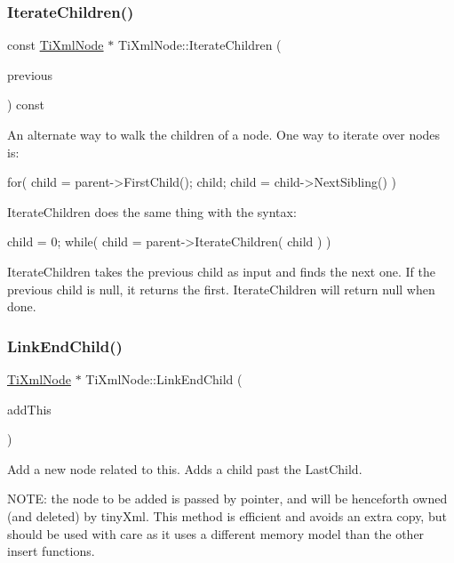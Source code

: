 \subsubsection{\texorpdfstring{Iterate\+Children()}{IterateChildren()}}
{\footnotesize\ttfamily const \hyperlink{class_ti_xml_node}{Ti\+Xml\+Node} $\ast$ Ti\+Xml\+Node\+::\+Iterate\+Children (\begin{DoxyParamCaption}\item[{const \hyperlink{class_ti_xml_node}{Ti\+Xml\+Node} $\ast$}]{previous }\end{DoxyParamCaption}) const}

An alternate way to walk the children of a node. One way to iterate over nodes is\+: \begin{DoxyVerb}    for( child = parent->FirstChild(); child; child = child->NextSibling() )
\end{DoxyVerb}


Iterate\+Children does the same thing with the syntax\+: \begin{DoxyVerb}    child = 0;
    while( child = parent->IterateChildren( child ) )
\end{DoxyVerb}


Iterate\+Children takes the previous child as input and finds the next one. If the previous child is null, it returns the first. Iterate\+Children will return null when done. \mbox{\label{class_ti_xml_node_a1a881212554b759865f6cac79a851d38}} 
\subsubsection{\texorpdfstring{Link\+End\+Child()}{LinkEndChild()}}
{\footnotesize\ttfamily \hyperlink{class_ti_xml_node}{Ti\+Xml\+Node} $\ast$ Ti\+Xml\+Node\+::\+Link\+End\+Child (\begin{DoxyParamCaption}\item[{\hyperlink{class_ti_xml_node}{Ti\+Xml\+Node} $\ast$}]{add\+This }\end{DoxyParamCaption})}

Add a new node related to this. Adds a child past the Last\+Child.

N\+O\+TE\+: the node to be added is passed by pointer, and will be henceforth owned (and deleted) by tiny\+Xml. This method is efficient and avoids an extra copy, but should be used with care as it uses a different memory model than the other insert functions.

